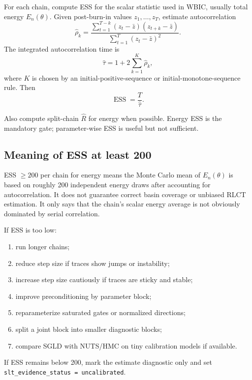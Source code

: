 \documentclass[11pt]{article}
\begin{document}
For each chain, compute ESS for the scalar statistic used in WBIC, usually total energy $E_n(\theta)$.  Given post-burn-in values $z_1,\ldots,z_T$, estimate autocorrelation
\begin{equation}
  \hat\rho_k
  = \frac{\sum_{t=1}^{T-k}(z_t-\bar z)(z_{t+k}-\bar z)}
         {\sum_{t=1}^{T}(z_t-\bar z)^2}.
\end{equation}
The integrated autocorrelation time is
\begin{equation}
  \hat\tau = 1 + 2\sum_{k=1}^{K}\hat\rho_k,
\end{equation}
where $K$ is chosen by an initial-positive-sequence or initial-monotone-sequence rule.  Then
\begin{equation}
  \operatorname{ESS} = \frac{T}{\hat\tau}.
\end{equation}

Also compute split-chain $\hat R$ for energy when possible.  Energy ESS is the mandatory gate; parameter-wise ESS is useful but not sufficient.

\subsection{Meaning of ESS at least 200}

ESS $\geq 200$ per chain for energy means the Monte Carlo mean of $E_n(\theta)$ is based on roughly 200 independent energy draws after accounting for autocorrelation.  It does not guarantee correct basin coverage or unbiased RLCT estimation.  It only says that the chain's scalar energy average is not obviously dominated by serial correlation.

If ESS is too low:
\begin{enumerate}[(1)]
\item run longer chains;
\item reduce step size if traces show jumps or instability;
\item increase step size cautiously if traces are sticky and stable;
\item improve preconditioning by parameter block;
\item reparameterize saturated gates or normalized directions;
\item split a joint block into smaller diagnostic blocks;
\item compare SGLD with NUTS/HMC on tiny calibration models if available.
\end{enumerate}
If ESS remains below 200, mark the estimate diagnostic only and set \texttt{slt\_evidence\_status = uncalibrated}.
\end{document}

